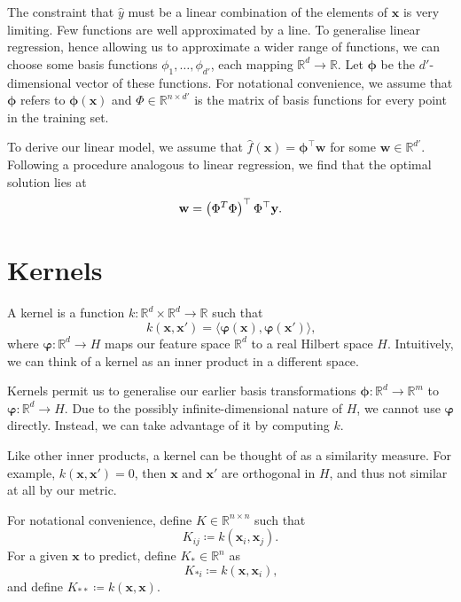 \documentclass[11pt,twoside,openright]{report}
\newcommand\bphi{\bm{\phi}}
\newcommand\bvarphi{\bm{\varphi}}
\newcommand\bbR{\mathbb{R}}
\newcommand\bw{\mathbf{w}}
\newcommand\bx{\mathbf{x}}
\newcommand\by{\mathbf{y}}
\begin{document}
The constraint that $\hat y$ must be a linear combination of the elements of $\bx$ is very limiting. Few functions are well approximated by a line. To generalise linear regression, hence allowing us to approximate a wider range of functions, we can choose some basis functions $\phi_1, \dots, \phi_{d'}$, each mapping $\bbR^d \to \bbR$. Let $\bphi$ be the $d'$-dimensional vector of these functions. For notational convenience, we assume that $\bphi$ refers to $\bphi(\bx)$ and $\Phi \in \bbR^{n \times d'}$ is the matrix of basis functions for every point in the training set.

To derive our linear model, we assume that $\hat f(\bx) = \bphi^\top \bw$ for some $\bw \in \bbR^{d'}$. Following a procedure analogous to linear regression, we find that the optimal solution lies at \[
  \bw = \left(\Phi^T\Phi\right)^\top \Phi^\top \by \text.
\]

\section{Kernels}

A kernel is a function $k : \bbR^d \times \bbR^d \to \bbR$ such that \[
    k(\bx, \bx') = \langle \bvarphi\left(\bx\right), \bvarphi\left(\bx'\right)\rangle \text{,}
\] where $\bvarphi : \bbR^d \to H$ maps our feature space $\bbR^d$ to a real Hilbert space $H$. Intuitively, we can think of a kernel as an inner product in a different space.

Kernels permit us to generalise our earlier basis transformations $\bphi : \bbR^d \to \bbR^m$ to $\bvarphi : \bbR^d \to H$. Due to the possibly infinite-dimensional nature of $H$, we cannot use $\bvarphi$ directly. Instead, we can take advantage of it by computing $k$.

Like other inner products, a kernel can be thought of as a similarity measure. For example, $k(\bx, \bx') = 0$, then $\bx$ and $\bx'$ are orthogonal in $H$, and thus not similar at all by our metric.

For notational convenience, define $K \in \bbR^{n\times n}$ such that \[
  K_{ij} \coloneqq k(\bx_i, \bx_j) \text{.}
\] For a given $\bx$ to predict, define $K_* \in \bbR^n$ as \[
  K_{*i} \coloneqq k(\bx, \bx_i)\text{,}
\] and define $K_{**} \coloneqq k(\bx, \bx)$.
\end{document}

